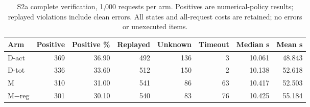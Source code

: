 \begin{table}[ht]
\centering\small
\begin{tabular}{lrrrrrrr}
\toprule
Arm & Positive & Positive \% & Replayed & Unknown & Timeout & Median s & Mean s\\
\midrule
D-act & 369 & 36.90 & 492 & 136 & 3 & 10.061 & 48.843\\
D-tot & 336 & 33.60 & 512 & 150 & 2 & 10.138 & 52.618\\
M & 310 & 31.00 & 541 & 86 & 63 & 10.417 & 52.503\\
M$-$reg & 301 & 30.10 & 540 & 83 & 76 & 10.425 & 55.184\\
\bottomrule
\end{tabular}
\caption{S2a complete verification, 1,000 requests per arm. Positives are numerical-policy results; replayed violations include clean errors. All states and all-request costs are retained; no errors or unexecuted items.}
\label{tab:s2complete}
\end{table}
